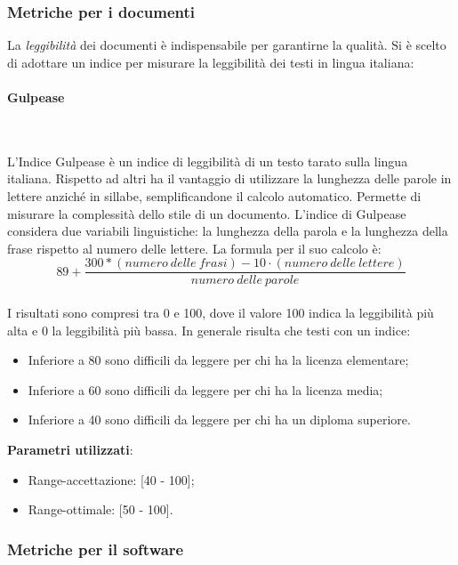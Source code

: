 		\subsubsection{Metriche per i documenti}
		\label{metrichedocumenti}
		
		La \emph{leggibilità} dei documenti è indispensabile per garantirne la qualità. Si è scelto di adottare un indice per misurare la leggibilità dei testi in lingua italiana:
			
			\paragraph{Gulpease}\mbox{} \\
			\label{gulpease}
			
			L'Indice Gulpease è un indice di leggibilità di un testo tarato sulla lingua italiana. Rispetto ad altri ha il vantaggio di utilizzare la lunghezza delle parole in lettere anziché in sillabe, semplificandone il calcolo automatico. Permette di misurare la complessità dello stile di un documento.
			L'indice di Gulpease considera due variabili linguistiche: la lunghezza della parola e la lunghezza della frase rispetto al numero delle lettere.
			La formula per il suo calcolo è: \\
			$$
			89 + \frac{300 * (numero\ delle\ frasi) - 10 \cdot (numero\ delle\ lettere)}{numero\ delle\ parole}
			$$ \\
			I risultati sono compresi tra 0 e 100, dove il valore 100 indica la leggibilità più alta e 0 la leggibilità più bassa. In generale risulta che testi con un indice:
			\begin{itemize}
				\item Inferiore a 80 sono difficili da leggere per chi ha la licenza elementare;
				\item Inferiore a 60 sono difficili da leggere per chi ha la licenza media;
				\item Inferiore a 40 sono difficili da leggere per chi ha un diploma superiore.
			\end{itemize}
			\textbf{Parametri utilizzati}:
			\begin{itemize}
				\item Range-accettazione: [40 - 100];
				\item Range-ottimale: [50 - 100].
			\end{itemize}
			
		\subsubsection{Metriche per il software}

